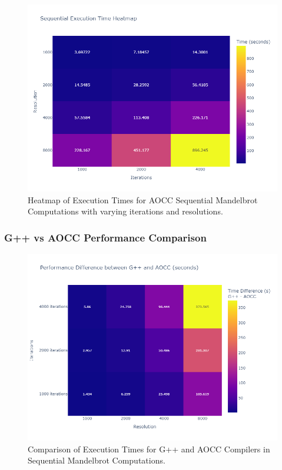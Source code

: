 \documentclass[
	report, %
	11pt, %
]{CSUniSchoolLabReport}
\newcounter{ct}
\begin{document}
\begin{figure}[H]
	\captionsetup{justification=centering, width=.8\linewidth}
	\centering
	\includegraphics[width=\textwidth]{./img/mandelbrot_aocc_seq_heatmap.png}
	\caption{Heatmap of Execution Times for AOCC Sequential Mandelbrot Computations with varying iterations and resolutions.}
	\label{fig:mandelbrot_aocc_seq_heatmap}
\end{figure}

\subsubsection{G++ vs AOCC Performance Comparison}

\begin{figure}[H]
	\captionsetup{justification=centering, width=.8\linewidth}
	\centering
	\includegraphics[width=\textwidth]{./img/mandelbrot_gcc_vs_aocc.png}
	\caption{Comparison of Execution Times for G++ and AOCC Compilers in Sequential Mandelbrot Computations.}
	\label{fig:mandelbrot_gcc_vs_aocc}
\end{figure}
\end{document}
